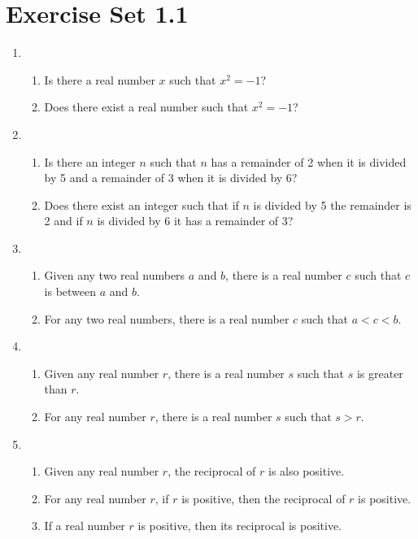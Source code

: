\documentclass[12pt]{article}
\begin{document}
\section*{Exercise Set 1.1}
\begin{enumerate}
\item
  \begin{enumerate}
  \item Is there a real number $x$ such that $x^{2} = -1$?
  \item Does there exist a real number such that $x^{2} = -1$?
  \end{enumerate}

\item
  \begin{enumerate}
  \item Is there an integer $n$ such that $n$ has a remainder of 2
    when it is divided by 5 and a remainder of 3 when it is divided by 6?
  \item Does there exist an integer such that if $n$ is divided by 5
    the remainder is 2 and if $n$ is divided by 6 it has a remainder
    of 3?
  \end{enumerate}

\item 
  \begin{enumerate}
  \item Given any two real numbers $a$ and $b$, there is a real number
    $c$ such that $c$ is between $a$ and $b$.
  \item For any two real numbers, there is a real number $c$ such that
    $a < c < b$.
  \end{enumerate}

\item %
  \begin{enumerate}
  \item Given any real number $r$, there is a real number $s$ such
    that $s$ is greater than $r$.
  \item For any real number $r$, there is a real number $s$ such that
    $s > r$.
  \end{enumerate}

\item %
  \begin{enumerate}
  \item Given any real number $r$, the reciprocal of $r$ is also positive.
  \item For any real number $r$, if $r$ is positive, then the
    reciprocal of $r$ is positive.
  \item If a real number $r$ is positive, then its reciprocal is positive.
  \end{enumerate}


\end{enumerate}
\end{document}
